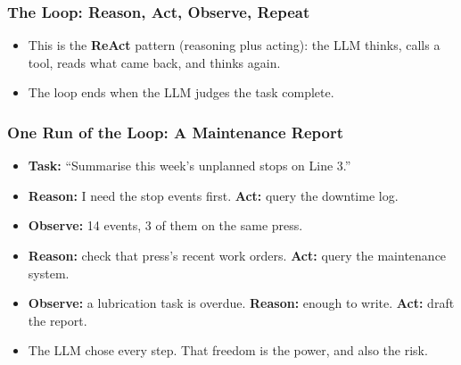 \begin{frame}[fragile]\frametitle{The Loop: Reason, Act, Observe, Repeat}
\begin{center}
\end{center}
\begin{itemize}
\item This is the \textbf{ReAct} pattern (reasoning plus acting): the LLM thinks, calls a tool, reads what came back, and thinks again.
\item The loop ends when the LLM judges the task complete.
\end{itemize}
\end{frame}

\begin{frame}[fragile]\frametitle{One Run of the Loop: A Maintenance Report}
\begin{itemize}
\item \textbf{Task:} ``Summarise this week's unplanned stops on Line 3.''
\item \textbf{Reason:} I need the stop events first. \textbf{Act:} query the downtime log.
\item \textbf{Observe:} 14 events, 3 of them on the same press.
\item \textbf{Reason:} check that press's recent work orders. \textbf{Act:} query the maintenance system.
\item \textbf{Observe:} a lubrication task is overdue. \textbf{Reason:} enough to write. \textbf{Act:} draft the report.
\item The LLM chose every step. That freedom is the power, and also the risk.
\end{itemize}
\end{frame}

